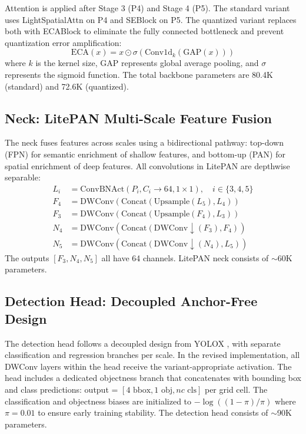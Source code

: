 \documentclass[journal]{IEEEtran}
\begin{document}
Attention is applied after Stage 3 (P4) and Stage 4 (P5). The standard variant uses LightSpatialAttn on P4 and SEBlock on P5. The quantized variant replaces both with ECABlock to eliminate the fully connected bottleneck and prevent quantization error amplification:
\begin{equation}
\text{ECA}(x) = x \odot \sigma(\text{Conv1d}_{k}(\text{GAP}(x)))
\end{equation}
where $k$ is the kernel size, $\text{GAP}$ represents global average pooling, and $\sigma$ represents the sigmoid function. The total backbone parameters are 80.4K (standard) and 72.6K (quantized).

\subsection{Neck: LitePAN Multi-Scale Feature Fusion}
The neck fuses features across scales using a bidirectional pathway: top-down (FPN) for semantic enrichment of shallow features, and bottom-up (PAN) for spatial enrichment of deep features. All convolutions in LitePAN are depthwise separable:
\begin{align}
  L_i &= \text{ConvBNAct}(P_i, C_i \to 64, 1\times1), \quad i \in \{3, 4, 5\} \\
  F_4 &= \text{DWConv}(\text{Concat}(\text{Upsample}(L_5), L_4)) \\
  F_3 &= \text{DWConv}(\text{Concat}(\text{Upsample}(F_4), L_3)) \\
  N_4 &= \text{DWConv}(\text{Concat}(\text{DWConv}\downarrow(F_3), F_4)) \\
  N_5 &= \text{DWConv}(\text{Concat}(\text{DWConv}\downarrow(N_4), L_5))
\end{align}
The outputs $[F_3, N_4, N_5]$ all have 64 channels. LitePAN neck consists of $\sim$60K parameters.

\subsection{Detection Head: Decoupled Anchor-Free Design}
The detection head follows a decoupled design from YOLOX \cite{ge2021yolox}, with separate classification and regression branches per scale. In the revised implementation, all DWConv layers within the head receive the variant-appropriate activation. The head includes a dedicated objectness branch that concatenates with bounding box and class predictions: output = $[4 \text{ bbox}, 1 \text{ obj}, nc \text{ cls}]$ per grid cell. The classification and objectness biases are initialized to $-\log((1-\pi)/\pi)$ where $\pi = 0.01$ to ensure early training stability. The detection head consists of $\sim$90K parameters.
\end{document}
